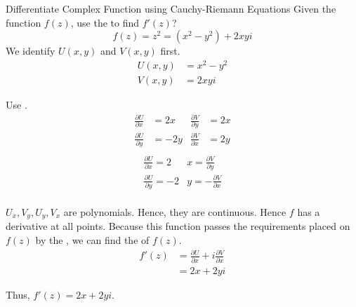 \begin{example}[Lecture 5]{Differentiate Complex Function using Cauchy-Riemann Equations}
  Given the function $f(z)$, use the  to find $f'(z)$?
  \begin{equation*}
    f(z) = z^{2} = \left( x^{2} - y^{2} \right) + 2xyi
  \end{equation*}
  \tcblower{}
  We identify $U(x, y)$ and $V(x, y)$ first.
  \begin{align*}
    U(x, y) &= x^{2} - y^{2} \\
    V(x, y) &= 2xyi
  \end{align*}

  Use .
  \begin{align*}
    \frac{\partial U}{\partial x} &= 2x & \frac{\partial V}{\partial y} &= 2x \\
    \frac{\partial U}{\partial y} &= -2y & \frac{\partial V}{\partial x} &= 2y \\
  \end{align*}
  \begin{align*}
    \frac{\partial U}{\partial x} = 2&x = \frac{\partial V}{\partial y} \\
    \frac{\partial U}{\partial y} = -2&y = -\frac{\partial V}{\partial x} \\
  \end{align*}

  $U_{x}, V_{y}, U_{y}, V_{x}$ are polynomials.
  Hence, they are continuous.
  Hence $f$ has a derivative at all points.
  Because this function passes the requirements placed on $f(z)$ by the , we can find the  of $f(z)$.
  \begin{align*}
    f'(z) &= \frac{\partial U}{\partial x} + i \frac{\partial V}{\partial x} \\
          &= 2x + 2yi
  \end{align*}

  Thus, $f'(z) = 2x + 2yi$.
\end{example}

